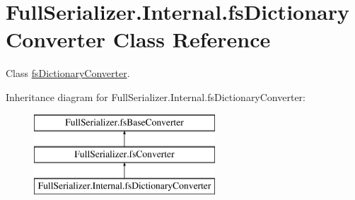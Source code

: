 \hypertarget{class_full_serializer_1_1_internal_1_1fs_dictionary_converter}{}\section{Full\+Serializer.\+Internal.\+fs\+Dictionary\+Converter Class Reference}
\label{class_full_serializer_1_1_internal_1_1fs_dictionary_converter}


Class \hyperlink{class_full_serializer_1_1_internal_1_1fs_dictionary_converter}{fs\+Dictionary\+Converter}.  


Inheritance diagram for Full\+Serializer.\+Internal.\+fs\+Dictionary\+Converter\+:\begin{figure}[H]
\begin{center}
\leavevmode
\includegraphics[height=3.000000cm]{class_full_serializer_1_1_internal_1_1fs_dictionary_converter}
\end{center}
\end{figure}

